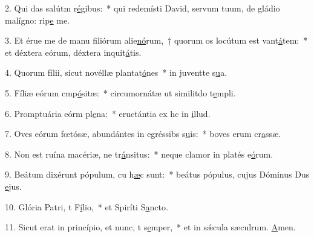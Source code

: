 2. Qui das salútm r\uline{é}gibus:~* qui redemísti David, servum tuum, de gládio malígno: rip\uline{e} me.\par 
3. Et érue me de manu filiórum alie\uline{nó}rum,~† quorum os locútum est vant\uline{á}tem:~* et déxtera eórum, déxtera inquit\uline{á}tis.\par 
4. Quorum fílii, sicut novéllæ plantat\uline{ó}nes~* in juventte s\uline{u}a.\par 
5. Fíliæ eórum cmp\uline{ó}sitæ:~* circumornátæ ut similitdo t\uline{e}mpli.\par 
6. Promptuária eórm pl\uline{e}na:~* eructántia ex hc in \uline{i}llud.\par 
7. Oves eórum fœtósæ, abundántes in egréssibs s\uline{u}is:~* boves erum cr\uline{a}ssæ.\par 
8. Non est ruína macériæ, ne tr\uline{á}nsitus:~* neque clamor in platés e\uline{ó}rum.\par 
9. Beátum dixérunt pópulum, cu h\uline{æ}c sunt:~* beátus pópulus, cujus Dóminus Dus \uline{e}jus.\par 
10. Glória Patri, t F\uline{í}lio,~* et Spiríti S\uline{a}ncto.\par 
11. Sicut erat in princípio, et nunc, t s\uline{e}mper,~* et in sǽcula sæculrum. \uline{A}men.\par 
